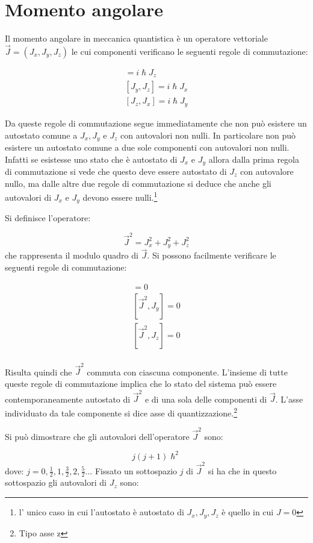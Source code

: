 \section{Momento angolare}
Il momento angolare in meccanica quantistica è un operatore vettoriale 
$\vec{J}=
(J_x, J_y, J_z)$ le cui componenti verificano le seguenti regole di
commutazione:

\begin{gather}
[J_x, J_y]= i\hslash J_z\\
[J_y, J_z]= i\hslash J_x\\
[J_z, J_x]= i\hslash J_y
\end{gather}

Da queste regole di commutazione segue immediatamente che non può esistere un
autostato comune a $J_x, J_y$ e $J_z$ con autovalori non nulli.
In particolare non può esistere un autostato comune a due sole componenti con
autovalori non nulli. Infatti se esistesse uno stato che è autostato di $J_x$ e
$J_y$ allora dalla
prima regola di commutazione si vede che questo deve essere autostato di $J_z$
con autovalore nullo, ma dalle altre due regole di commutazione si deduce che
anche gli autovalori di $J_x$ e $J_y$ devono essere nulli.\footnote{l' unico
caso in cui l'autostato è autostato di $J_x, J_y, J_z$ è quello in cui $J=0$}

Si definisce l'operatore:

\begin{equation}
\vec{J}^2=J_{x}^2+J_{y}^2+J_{z}^2
\end{equation}
che rappresenta il modulo quadro di $\vec{J}$. Si possono facilmente verificare
le seguenti regole di commutazione:

\begin{gather}
[\vec{J}^2,J_x]= 0\\
[\vec{J}^2,J_y]= 0\\
[\vec{J}^2,J_z]= 0\\
\end{gather}

Risulta quindi che $\vec{J}^2$ commuta con ciascuna componente.
L'insieme di tutte queste regole di commutazione implica che lo stato del
sistema può essere contemporaneamente autostato di $\vec{J}^2$ e di una sola
delle componenti di
$\vec{J}$. L'asse individuato da tale componente si dice asse di
quantizzazione.\footnote{Tipo asse z}

Si può dimostrare che gli autovalori dell'operatore $\vec{J}^2$ sono:

\begin{equation}
j(j+1)\hslash^2
\end{equation}
dove: $j=0,\frac{1}{2},1,\frac{3}{2},2,\frac{5}{2}\dots$ Fissato un sottospazio
$j$ di $\vec{J}^2$ si ha che in questo sottospazio gli autovalori di $J_z$ sono:

